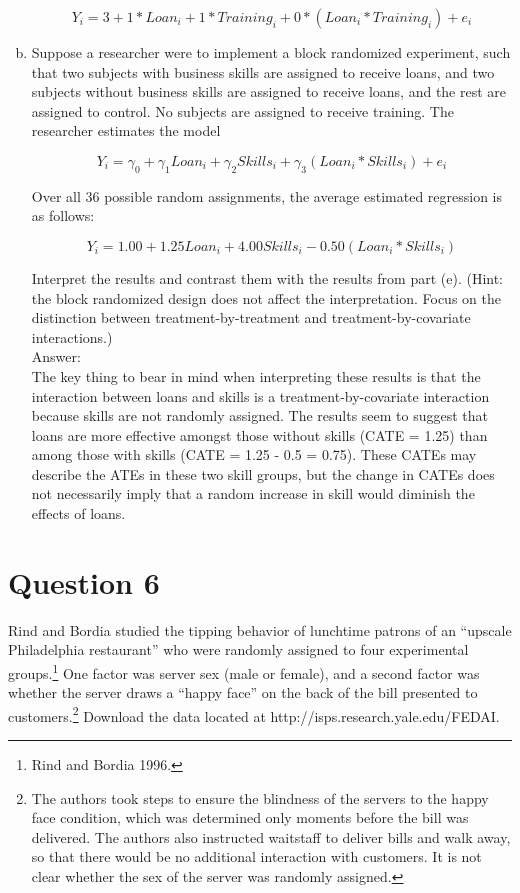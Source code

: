 \documentclass[11pt,notitlepage]{article}\usepackage[]{graphicx}\usepackage[]{color}
\begin{document}
\begin{enumerate}[a)]
\begin{equation}
Y_i = 3 + 1*Loan_i + 1*Training_i + 0*(Loan_i * Training_i) + e_i
\end{equation}


\item Suppose a researcher were to implement a block randomized experiment, such that two subjects with business skills are assigned to receive loans, and two subjects without business skills are assigned to receive loans, and the rest are assigned to control. No subjects are assigned to receive training. The researcher estimates the model

\begin{equation}
Y_i = \gamma_0 + \gamma_1 Loan_i + \gamma_2 Skills_i + \gamma_3 (Loan_i * Skills_i) + e_i
\end{equation}

Over all 36 possible random assignments, the average estimated regression is as follows:

\begin{equation}
Y_i = 1.00 + 1.25 Loan_i + 4.00 Skills_i - 0.50 (Loan_i * Skills_i)
\end{equation}

Interpret the results and contrast them with the results from part (e). (Hint: the block randomized design does not affect the interpretation. Focus on the distinction between treatment-by-treatment and treatment-by-covariate interactions.)\\
Answer:\\
The key thing to bear in mind when interpreting these results is that the interaction between loans and skills is a treatment-by-covariate interaction because skills are not randomly assigned. The results seem to suggest that loans are more effective amongst those without skills (CATE = 1.25) than among those with skills (CATE = 1.25 - 0.5 = 0.75). These CATEs may describe the ATEs in these two skill groups, but the change in CATEs does not necessarily imply that a random increase in skill would diminish the effects of loans.  
\end{enumerate}

\section*{Question 6}
Rind and Bordia studied the tipping behavior of lunchtime patrons of an ``upscale Philadelphia restaurant'' who were randomly assigned to four experimental groups.\footnote{Rind and Bordia 1996.} One factor was server sex (male or female), and a second factor was whether the server draws a ``happy face'' on the back of the bill presented to customers.\footnote{The authors took steps to ensure the blindness of the servers to the happy face condition, which was determined only moments before the bill was delivered. The authors also instructed waitstaff to deliver bills and walk away, so that there would be no additional interaction with customers. It is not clear whether the sex of the server was randomly assigned.} Download the data located at http://isps.research.yale.edu/FEDAI.
\end{document}
